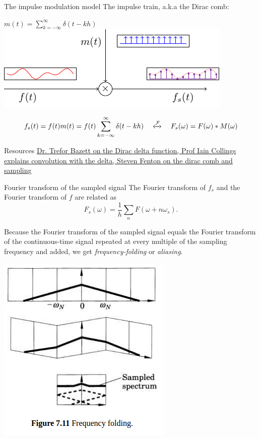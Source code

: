 \documentclass[presentation,aspectratio=169]{beamer}
\begin{document}
\begin{frame}[label={sec:org74deb48}]{The impulse modulation model}
The \alert{impulse train}, a.k.a the \alert{Dirac comb}:
\begin{center}
\(m(t) = \sum_{k=-\infty}^{\infty} \delta(t-kh)\)\hspace*{10mm}
 \includegraphics[width=0.6\linewidth]{../../figures/modulation-model-blocks}
\end{center}

\pause
\[f_s(t) = f(t)m(t) = f(t) \sum_{k=-\infty}^{\infty} \delta(t-kh) \quad\xleftrightarrow{\mathcal{F}}\quad F_s(\omega) = F(\omega) \ast M(\omega)\]

\pause

\footnotesize

\begin{block}{Resources}
\href{https://youtu.be/SxNVcCVj-3c}{Dr. Trefor Bazett on the Dirac delta function, }
\href{https://youtu.be/TIcfY19dk0c}{Prof Iain Collings explains convolution with the delta, }
\href{https://youtu.be/nHguB7MvCfI}{Steven Fenton on the dirac comb and sampling}
\end{block}
\end{frame}

\begin{frame}[label={sec:org0261dd9}]{Fourier transform of the sampled signal}
The Fourier transform of \(f_s\) and the Fourier transform of \(f\) are related as
\[ F_s(\omega) = \frac{1}{h} \sum_n F(\omega + n\omega_s). \]

Because the Fourier transform of the sampled signal equals the Fourier transform of the continuous-time signal repeated at every multiple of the sampling frequency and added, we get \emph{frequency-folding} or \emph{aliasing}.

\begin{center}
\includegraphics[width=0.28\linewidth]{../../figures/frequency-folding.png}
\end{center}
\end{frame}
\end{document}
